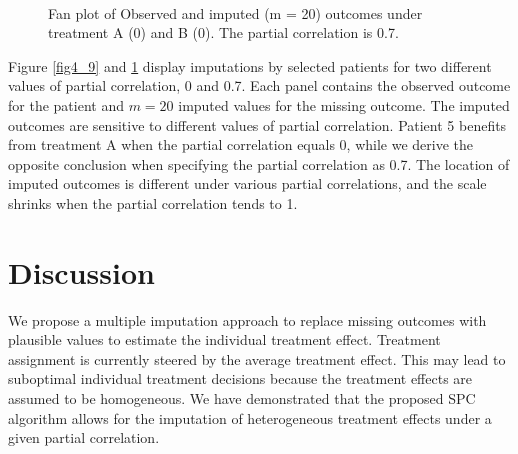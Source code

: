 \begin{figure}[ht!]
\begin{center}
{{				}
			}\\
		\end{center}
		\caption{Fan plot of Observed and imputed (m = 20) outcomes under treatment A (0) and B (0). The partial correlation is 0.7.}
		\label{fig4_10}
	\end{figure}
	Figure \ref{fig4_9} and \ref{fig4_10} display imputations by selected patients for two different values of partial correlation, 0 and 0.7. Each panel contains the observed outcome for the patient and $m = 20$ imputed values for the missing outcome. The imputed outcomes are sensitive to different values of partial correlation. Patient 5 benefits from treatment A when the partial correlation equals 0, while we derive the opposite conclusion when specifying the partial correlation as 0.7. The location of imputed outcomes is different under various partial correlations, and the scale shrinks when the partial correlation tends to 1.  
	
	\section{Discussion}
	\label{sec:4.7}
	We propose a multiple imputation approach to replace missing outcomes with plausible values to estimate the individual treatment effect. Treatment assignment is currently steered by the average treatment effect. This may lead to suboptimal individual treatment decisions because the treatment effects are assumed to be homogeneous. We have demonstrated that the proposed SPC algorithm allows for the imputation of heterogeneous treatment effects under a given partial correlation. 
	

